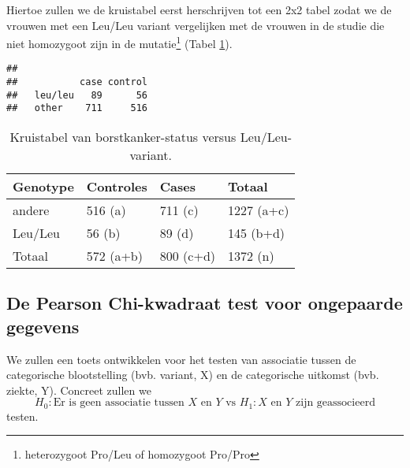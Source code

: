 \documentclass[
  12pt,dutch,coursenotes]{book}
\newenvironment{Shaded}{\begin{snugshade}}{\end{snugshade}}
\newcommand{\KeywordTok}[1]{\textcolor[rgb]{0.13,0.29,0.53}{\textbf{#1}}}
\newcommand{\NormalTok}[1]{#1}
\newcommand{\OperatorTok}[1]{\textcolor[rgb]{0.81,0.36,0.00}{\textbf{#1}}}
\newcommand{\StringTok}[1]{\textcolor[rgb]{0.31,0.60,0.02}{#1}}
\theoremstyle{definition}
\theoremstyle{definition}
\theoremstyle{definition}
\theoremstyle{remark}
\begin{document}
Hiertoe zullen we de kruistabel eerst herschrijven tot een 2x2 tabel zodat we de vrouwen met een Leu/Leu variant vergelijken met de vrouwen in de studie die niet homozygoot zijn in de mutatie\footnote{heterozygoot Pro/Leu of homozygoot Pro/Pro} (Tabel \ref{tab:leu4}).

\begin{Shaded}
\end{Shaded}

\begin{verbatim}
##          
##           case control
##   leu/leu   89      56
##   other    711     516
\end{verbatim}

\begin{table}

\caption{\label{tab:leu4}Kruistabel van borstkanker-status versus Leu/Leu-variant.}
\centering
\begin{tabular}[t]{llll}
\toprule
Genotype & Controles & Cases & Totaal\\
\midrule
andere & 516 (a) & 711 (c) & 1227 (a+c)\\
Leu/Leu & 56 (b) & 89 (d) & 145 (b+d)\\
Totaal & 572 (a+b) & 800 (c+d) & 1372 (n)\\
\bottomrule
\end{tabular}
\end{table}

\hypertarget{de-pearson-chi-kwadraat-test-voor-ongepaarde-gegevens}{%
\subsection{De Pearson Chi-kwadraat test voor ongepaarde gegevens}\label{de-pearson-chi-kwadraat-test-voor-ongepaarde-gegevens}}

We zullen een toets ontwikkelen voor het testen van associatie tussen de categorische blootstelling (bvb. variant, X) en de categorische uitkomst (bvb. ziekte, Y).
Concreet zullen we
\[H_0: \text{Er is geen associatie tussen } X \text{ en } Y \text{ vs } H_1: X \text{ en } Y \text{ zijn geassocieerd}\]
testen.
\end{document}
